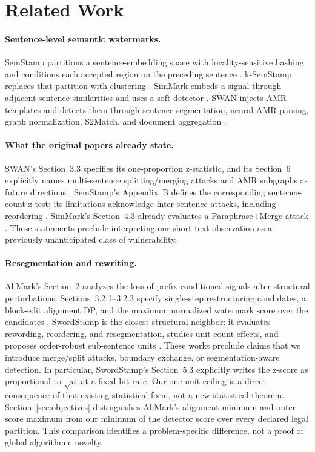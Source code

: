 \documentclass[10pt]{article}
\begin{document}
\section{Related Work}

\paragraph{Sentence-level semantic watermarks.}
SemStamp partitions a sentence-embedding space with locality-sensitive
hashing and conditions each accepted region on the preceding sentence
\citep{hou2024semstamp}. k-SemStamp replaces that partition with clustering
\citep{hou2024ksemstamp}. SimMark embeds a signal through adjacent-sentence
similarities and uses a soft detector \citep{dabiriaghdam2025simmark}. SWAN
injects AMR templates and detects them through sentence segmentation, neural
AMR parsing, graph normalization, S2Match, and document aggregation
\citep{ye2026swan}.

\paragraph{What the original papers already state.}
SWAN's Section~3.3 specifies its one-proportion z-statistic, and its
Section~6 explicitly names multi-sentence splitting/merging attacks and
AMR subgraphs as future directions \citep{ye2026swan}. SemStamp's Appendix~B
defines the corresponding sentence-count z-test; its limitations acknowledge
inter-sentence attacks, including reordering \citep{hou2024semstamp}.
SimMark's Section~4.3 already evaluates a Paraphrase+Merge attack
\citep{dabiriaghdam2025simmark}. These statements preclude interpreting our
short-text observation as a previously unanticipated class of vulnerability.

\paragraph{Resegmentation and rewriting.}
AliMark's Section~2 analyzes the loss of prefix-conditioned signals after
structural perturbations. Sections~3.2.1--3.2.3 specify single-step
restructuring candidates, a block-edit alignment DP, and the maximum
normalized watermark score over the candidates \citep{li2026alimark}.
SwordStamp is
the closest structural neighbor: it evaluates rewording, reordering, and
resegmentation, studies unit-count effects, and proposes order-robust
sub-sentence units \citep{diaa2026swordstamp}. These works preclude claims
that we introduce merge/split attacks, boundary exchange, or
segmentation-aware detection. In particular, SwordStamp's Section~5.3
explicitly writes the z-score as proportional to $\sqrt{n}$ at a fixed hit
rate. Our one-unit ceiling is a direct consequence of that existing
statistical form, not a new statistical theorem. Section~\ref{sec:objectives}
distinguishes AliMark's alignment minimum and outer score maximum from our
minimum of the detector score over every declared legal partition. This
comparison identifies a problem-specific difference, not a proof of global
algorithmic novelty.
\end{document}
